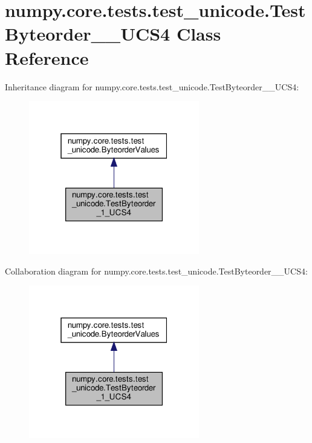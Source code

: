 \hypertarget{classnumpy_1_1core_1_1tests_1_1test__unicode_1_1TestByteorder__1__UCS4}{}\section{numpy.\+core.\+tests.\+test\+\_\+unicode.\+Test\+Byteorder\+\_\+\_\+\+U\+C\+S4 Class Reference}
\label{classnumpy_1_1core_1_1tests_1_1test__unicode_1_1TestByteorder__1__UCS4}


Inheritance diagram for numpy.\+core.\+tests.\+test\+\_\+unicode.\+Test\+Byteorder\+\_\+\_\+\+U\+C\+S4\+:
\nopagebreak
\begin{figure}[H]
\begin{center}
\leavevmode
\includegraphics[width=211pt]{classnumpy_1_1core_1_1tests_1_1test__unicode_1_1TestByteorder__1__UCS4__inherit__graph}
\end{center}
\end{figure}


Collaboration diagram for numpy.\+core.\+tests.\+test\+\_\+unicode.\+Test\+Byteorder\+\_\+\_\+\+U\+C\+S4\+:
\nopagebreak
\begin{figure}[H]
\begin{center}
\leavevmode
\includegraphics[width=211pt]{classnumpy_1_1core_1_1tests_1_1test__unicode_1_1TestByteorder__1__UCS4__coll__graph}
\end{center}
\end{figure}
